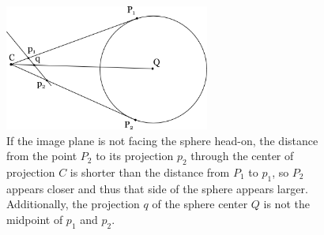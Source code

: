 \documentclass{thesis}
\begin{document}
\begin{figure}
	\centering
    	\includegraphics[width=0.6\textwidth]{sphere-distortion}
	\caption{If the image plane is not facing the sphere head-on, the distance from the point $P_2$ to its projection $p_2$ through the center of projection $C$ is shorter than the distance from $P_1$ to $p_1$, so $P_2$ appears closer and thus that side of the sphere appears larger. Additionally, the projection $q$ of the sphere center $Q$ is not the midpoint of $p_1$ and $p_2$.}
	\label{sphere-distortion}
\end{figure}
\end{document}
